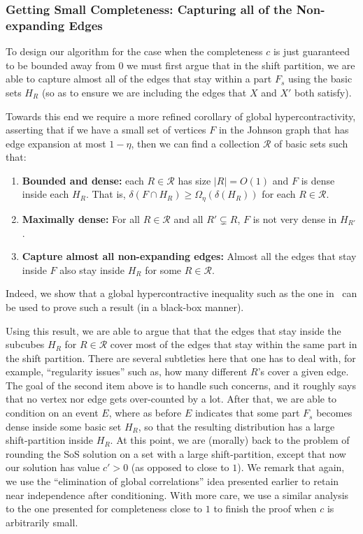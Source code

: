 \subsubsection{Getting Small Completeness: Capturing all of the Non-expanding Edges}
To design our algorithm for the case when the completeness $c$ is just 
guaranteed to be bounded away from $0$ we must first argue that in the shift partition, we are able to capture almost all 
of the edges that stay within a part $F_s$  
using the basic sets $H_R$ (so as to ensure we are including 
the edges that $X$ and $X'$ both satisfy).

Towards this end we require a more
refined corollary of global hypercontractivity, asserting 
that if we have a small set of vertices $F$ in the Johnson 
graph that has edge expansion at most $1-\eta$, then we 
can find a collection $\mathcal{R}$ of basic sets such that:
\begin{enumerate}
    \item \textbf{Bounded and dense:} 
    each $R\in \mathcal{R}$ has size $|R| = O(1)$ 
    and $F$ is dense inside each $H_R$. That is, 
    $\delta(F\cap H_R)\geq \Omega_{\eta}(\delta(H_R))$ for 
    each $R\in\mathcal{R}$.
    \item \textbf{Maximally dense:} 
    For all $R\in\mathcal{R}$ and all $R'\subsetneq R$, 
    $F$ is not very dense in $H_{R'}$.
    \item \textbf{Capture almost all non-expanding edges:} 
    Almost all the edges that stay inside $F$ also stay inside 
    $H_R$ for some $R\in\mathcal{R}$.
\end{enumerate}
Indeed, we show that a global hypercontractive inequality such as the one 
in~\cite{KMMS} can be used to prove such a result (in a black-box manner). 


Using this result, we are able to argue that that the edges that 
stay inside the subcubes $H_R$ for $R\in\mathcal{R}$  
cover most of the edges that stay within the same part in the shift
partition. There are several subtleties here that one has to deal with, for example, ``regularity issues'' such as, how many different $R$'s cover 
a given edge. The goal of the second item above is to handle such concerns, and it roughly says that no vertex nor 
edge gets over-counted by a lot. After that, we are able to 
condition on an event $E$, where as before $E$ indicates that some part 
$F_s$ becomes dense inside some basic set $H_R$, so that the resulting distribution has a large shift-partition inside $H_R$.
At this point, we are (morally) 
back to the problem of rounding the SoS solution 
on a set with a large shift-partition, except that now our solution 
has value $c'>0$ (as opposed to close to $1$). We remark that again, we use the ``elimination of global correlations'' 
idea presented earlier to retain near independence after conditioning. With more care, we use a similar analysis to the one presented for completeness close to $1$ to finish the proof when $c$ is arbitrarily small.



